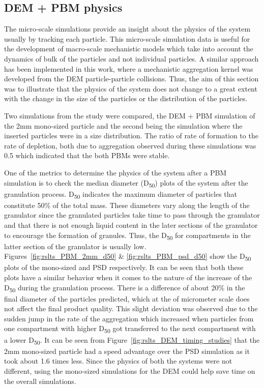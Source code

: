 \documentclass[preprint,11pt,authoryear]{elsarticle}
\begin{document}
\subsection{DEM + PBM physics}
The micro-scale simulations provide an insight about the physics of the system usually by tracking 
each particle. This micro-scale simulation data is useful for the development of macro-scale 
mechanistic models which take into account the dynamics of bulk of the particles and not individual 
particles. A similar approach has been implemented in this work, where a mechanistic aggregation 
kernel was developed from the DEM particle-particle collisions. Thus, the aim of this section was to 
illustrate that the physics of the system does not change to a great extent with the change in the size 
of the particles or the distribution of the particles.

Two simulations from the study were compared, the DEM + PBM simulation of the 2mm 
mono-sized particle and the second being the simulation where the inserted particles were in a size 
distribution. The ratio of rate of formation to the rate of depletion, both due to aggregation 
observed during these simulations was 0.5 which indicated that the both PBMs were stable.

One of the metrics to determine the physics of the system after a PBM simulation is to check the 
median diameter (D\textsubscript{50}) plots of the system after the granulation process. 
D\textsubscript{50} indicates the maximum diameter of particles that constitute 50\% of the total mass. 
These diameters vary along the length of the granulator since the granulated particles take time to 
pass through the granulator and that there is not enough liquid content in the later sections of 
the granulator to encourage the formation of granules. Thus, the D\textsubscript{50} for compartments 
in the latter section of the granulator is usually low. Figures~\ref{fig:rslts_PBM_2mm_d50} \& 
\ref{fig:rslts_PBM_psd_d50} show the D\textsubscript{50} plots of the mono-sized and PSD respectively. 
It can be seen that both these plots have a similar behavior when it comes to the nature of the 
increase of the D\textsubscript{50} during the granulation process. There is a difference of about 
20\% in the final diameter of the particles predicted, which at the of micrometer scale does not affect 
the final product quality. This slight deviation was observed due to the sudden jump in the 
rate of the aggregation which increased when particles from one compartment with higher 
D\textsubscript{50} got transferred to the next compartment with a lower D\textsubscript{50}. 
It can be seen from Figure~\ref{fig:rslts_DEM_timing_studies} that the 2mm mono-sized particle had a speed
advantage over the PSD simulation as it took about 1.6 times less. Since the physics of both the 
systems were not different, using the mono-sized simulations for the DEM could help save time on 
the overall simulations. 
\end{document}
